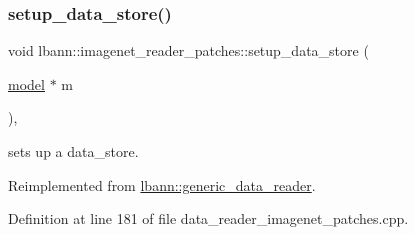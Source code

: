 \mbox{\label{classlbann_1_1imagenet__reader__patches_afad50e94c5d6bde9dff2abe5bad50e11}} 
\subsubsection{\texorpdfstring{setup\+\_\+data\+\_\+store()}{setup\_data\_store()}}
{\footnotesize\ttfamily void lbann\+::imagenet\+\_\+reader\+\_\+patches\+::setup\+\_\+data\+\_\+store (\begin{DoxyParamCaption}\item[{\hyperlink{classlbann_1_1model}{model} $\ast$}]{m }\end{DoxyParamCaption})\hspace{0.3cm}{\ttfamily [override]}, {\ttfamily [virtual]}}



sets up a data\+\_\+store. 



Reimplemented from \hyperlink{classlbann_1_1generic__data__reader_a8b2a09d38512fc11f1b9d572c89100a7}{lbann\+::generic\+\_\+data\+\_\+reader}.



Definition at line 181 of file data\+\_\+reader\+\_\+imagenet\+\_\+patches.\+cpp.



